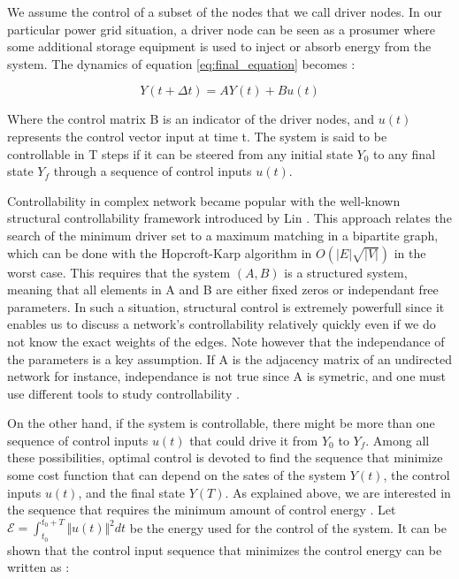 \documentclass[conference]{IEEEtran}
\begin{document}
We assume the control of a subset of the nodes that we call driver nodes. In our particular power grid situation, a driver node can be seen as a prosumer where some additional storage equipment is used to inject or absorb energy from the system. The dynamics of equation \ref{eq:final_equation} becomes :


\begin{equation}
\label{eq:final_with_control}
 Y(t+\Delta t) = A Y(t) + B u(t) 
\end{equation}


Where the control matrix B is an indicator of the driver nodes, and $ u(t) $ represents the control vector input at time t. The system is said to be controllable in T steps if it can be steered from any initial state $ Y_0 $ to any final state $ Y_f $ through a sequence of control inputs $ u(t) $. 

Controllability in complex network became popular with the well-known structural controllability framework introduced by Lin \cite{1100557}. This approach relates the search of the minimum driver set to a maximum matching in a bipartite graph, which can be done with the Hopcroft-Karp algorithm in $ O(|E|\sqrt{|V|}) $ in the worst case. This requires that the system $(A,B)$ is a structured system, meaning that all elements in A and B are either fixed zeros or independant free parameters. In such a situation, structural control is extremely powerfull since it enables us to discuss a network's controllability relatively quickly even if we do not know the exact weights of the edges. Note however that the independance of the parameters is a key assumption. If A is the adjacency matrix of an undirected network for instance, independance is not true since A is symetric, and one must use different tools to study controllability \cite{Yuan2014}. 

On the other hand, if the system is controllable, there might be more than one sequence of control inputs $u(t)$ that could drive it from $Y_0$ to $Y_f$. Among all these possibilities, optimal control is devoted to find the sequence that minimize some cost function that can depend on the sates of the system $Y(t)$, the control inputs $u(t)$, and the final state $Y(T)$. As explained above, we are interested in the sequence that requires the minimum amount of control energy \cite{Yan2012}. Let $ \mathcal{E} = \int_{t_0}^{t_0+T} \Vert u(t) \Vert^2 dt $ be the energy used for the control of the system. It can be shown \cite{Liu2015} that the control input sequence that minimizes the control energy can be written as :
\end{document}
